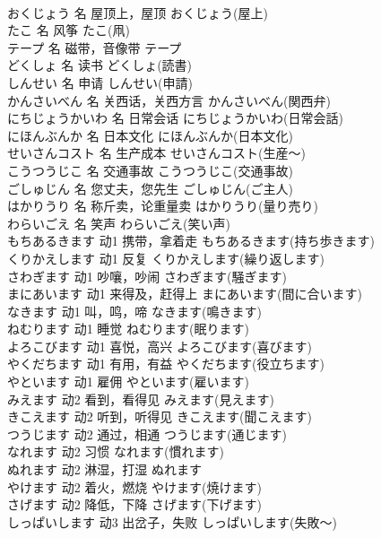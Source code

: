 \documentclass[8pt]{extreport}
\begin{document}
\begin{CJK}{UTF8}{min}
\\	おくじょう	名	屋顶上，屋顶	おくじょう(屋上)	
\\	たこ	名	风筝	たこ(凧)	
\\	テープ	名	磁带，音像带	テープ	
\\	どくしょ	名	读书	どくしょ(読書)	
\\	しんせい	名	申请	しんせい(申請)	
\\	かんさいべん	名	关西话，关西方言	かんさいべん(関西弁)	
\\	にちじょうかいわ	名	日常会话	にちじょうかいわ(日常会話)	
\\	にほんぶんか	名	日本文化	にほんぶんか(日本文化)	
\\	せいさんコスト	名	生产成本	せいさんコスト(生産～)	
\\	こうつうじこ	名	交通事故	こうつうじこ(交通事故)	
\\	ごしゅじん	名	您丈夫，您先生	ごしゅじん(ご主人)	
\\	はかりうり	名	称斤卖，论重量卖	はかりうり(量り売り)	
\\	わらいごえ	名	笑声	わらいごえ(笑い声)	
\\	もちあるきます	动1	携带，拿着走	もちあるきます(持ち歩きます)	
\\	くりかえします	动1	反复	くりかえします(繰り返します)	
\\	さわぎます	动1	吵嚷，吵闹	さわぎます(騒ぎます)	
\\	まにあいます	动1	来得及，赶得上	まにあいます(間に合います)	
\\	なきます	动1	叫，鸣，啼	なきます(鳴きます)	
\\	ねむります	动1	睡觉	ねむります(眠ります)	
\\	よろこびます	动1	喜悦，高兴	よろこびます(喜びます)	
\\	やくだちます	动1	有用，有益	やくだちます(役立ちます)	
\\	やといます	动1	雇佣	やといます(雇います)	
\\	みえます	动2	看到，看得见	みえます(見えます)	
\\	きこえます	动2	听到，听得见	きこえます(聞こえます)	
\\	つうじます	动2	通过，相通	つうじます(通じます)	
\\	なれます	动2	习惯	なれます(慣れます)	
\\	ぬれます	动2	淋湿，打湿	ぬれます	
\\	やけます	动2	着火，燃烧	やけます(焼けます)	
\\	さげます	动2	降低，下降	さげます(下げます)	
\\	しっぱいします	动3	出岔子，失败	しっぱいします(失敗～)	

\end{CJK}
\end{document}
